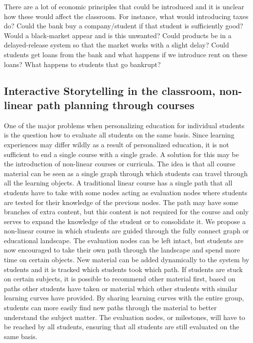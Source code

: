 \documentclass[11pt]{article}
\begin{document}
There are a lot of economic principles that could be introduced and it is unclear how these would affect the classroom. For instance, what would introducing taxes do? Could the bank buy a company/student if that student is sufficiently good? Would a black-market appear and is this unwanted? Could products be in a delayed-release system so that the market works with a slight delay? Could students get loans from the bank and what happens if we introduce rent on these loans? What happens to students that go bankrupt? 


\subsection{Interactive Storytelling in the classroom, non-linear path planning through courses}
One of the major problems when personalizing education for individual students is the question how to evaluate all students on the same basis. Since learning experiences may differ wildly as a result of personalized education, it is not sufficient to end a single course with a single grade. A solution for this may be the introduction of non-linear courses or curricula. The idea is that all course material can be seen as a single graph through which students can travel through all the learning objects. A traditional linear course has a single path that all students have to take with some nodes acting as evaluation nodes where students are tested for their knowledge of the previous nodes. The path may have some branches of extra content, but this content is not required for the course and only serves to expand the knowledge of the student or to consolidate it. We propose a non-linear course in which students are guided through the fully connect graph or educational landscape. The evaluation nodes can be left 
intact, but students are now encouraged to take their own path through the landscape and spend more time on certain objects. New material can be added dynamically to the system by students and it is tracked which students took which path. If students are stuck on certain subjects, it is possible to recommend other material first, based on paths other students have taken or material which other students with similar learning curves have provided. By sharing learning curves with the entire group, students can more easily find new paths through the material to better understand the subject matter. The evaluation nodes, or milestones, will have to be reached by all students, ensuring that all students are still evaluated on the same basis. 
\end{document}
